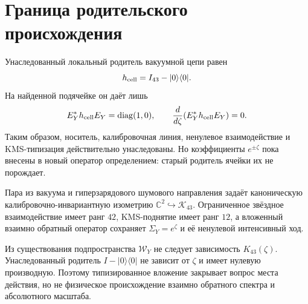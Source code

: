 \section{Граница родительского происхождения}

Унаследованный локальный родитель вакуумной цепи равен
\begin{equation}
 h_{\rm cell}=I_{43}-|0\rangle\langle0|.
 \label{eq:v10-inherited-cell-parent}
\end{equation}
На найденной подячейке он даёт лишь
\begin{equation}
 E_Y^*h_{\rm cell}E_Y=\operatorname{diag}(1,0),
 \qquad
 \frac{d}{d\zeta}(E_Y^*h_{\rm cell}E_Y)=0.
 \label{eq:v10-inherited-cell-parent-zero-running}
\end{equation}
Таким образом, носитель, калибровочная линия, ненулевое взаимодействие и
KMS-типизация действительно унаследованы. Но коэффициенты $e^{\pm\zeta}$
пока внесены в новый оператор определением: старый родитель ячейки их не
порождает.

\begin{theorem}
Пара из вакуума и гиперзарядового шумового направления задаёт каноническую
калибровочно-инвариантную изометрию $\mathbb C^2\hookrightarrow\mathcal
K_{43}$. Ограниченное звёздное взаимодействие имеет ранг $42$, KMS-поднятие
имеет ранг $12$, а вложенный взаимно обратный оператор сохраняет
$\Sigma_Y=e^{\zeta}$ и её ненулевой интенсивный ход.
\end{theorem}

\begin{nogocriterion}
Из существования подпространства $\mathcal W_Y$ не следует зависимость
$K_{43}(\zeta)$. Унаследованный родитель $I-|0\rangle\langle0|$ не зависит
от $\zeta$ и имеет нулевую производную. Поэтому типизированное вложение
закрывает вопрос места действия, но не физическое происхождение взаимно
обратного спектра и абсолютного масштаба.
\end{nogocriterion}

